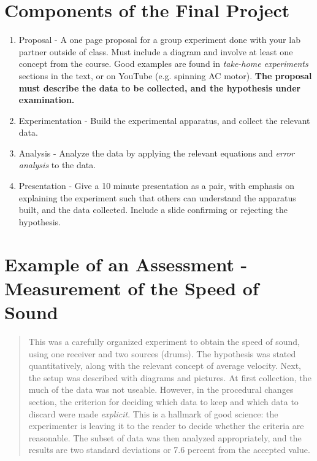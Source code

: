 \documentclass[10pt]{article}
\begin{document}
\maketitle

\section{Components of the Final Project}

\begin{enumerate}
\item Proposal - A one page proposal for a group experiment done with your lab partner outside of class.  Must include a diagram and involve at least one concept from the course.  Good examples are found in \textit{take-home experiments} sections in the text, or on YouTube (e.g. spinning AC motor). \textbf{The proposal must describe the data to be collected, and the hypothesis under examination.}
\item Experimentation - Build the experimental apparatus, and collect the relevant data.
\item Analysis - Analyze the data by applying the relevant equations and \textit{error analysis} to the data.
\item Presentation - Give a 10 minute presentation as a pair, with emphasis on explaining the experiment such that others can understand the apparatus built, and the data collected.  Include a slide confirming or rejecting the hypothesis.
\end{enumerate}

\section{Example of an Assessment - Measurement of the Speed of Sound}

\begin{abstract}
This was a carefully organized experiment to obtain the speed of sound, using one receiver and two sources (drums).  The hypothesis was stated quantitatively, along with the relevant concept of average velocity.  Next, the setup was described with diagrams and pictures.  At first collection, the much of the data was not useable.  However, in the procedural changes section, the criterion for deciding which data to keep and which data to discard were made \textit{explicit}.  This is a hallmark of good science: the experimenter is leaving it to the reader to decide whether the criteria are reasonable.  The subset of data was then analyzed appropriately, and the results are two standard deviations or 7.6 percent from the accepted value.
\end{abstract}
\end{document}
